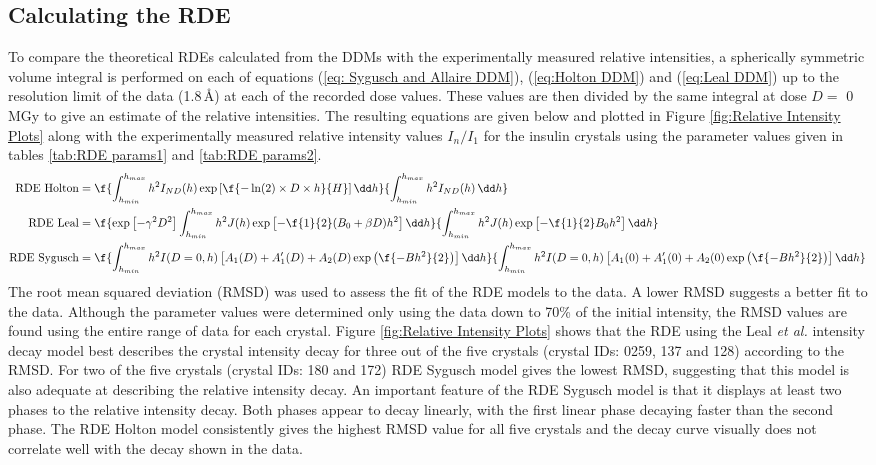 \subsection{Calculating the RDE}
\label{sub:Calculating the RDE}
To compare the theoretical RDEs calculated from the DDMs with the experimentally measured relative intensities, a spherically symmetric volume integral is performed on each of equations (\ref{eq: Sygusch and Allaire DDM}), (\ref{eq:Holton DDM}) and (\ref{eq:Leal DDM}) up to the resolution limit of the data (1.8$\,$\AA) at each of the recorded dose values.
These values are then divided by the same integral at dose $D =$ 0$\,$MGy to give an estimate of the relative intensities.
The resulting equations are given below and plotted in Figure \ref{fig:Relative Intensity Plots} along with the experimentally measured relative intensity values $I_n/I_1$ for the insulin crystals using the parameter values given in tables \ref{tab:RDE params1} and \ref{tab:RDE params2}.
\begin{align}
\text{RDE Holton} &= \f{\int^{h_{max}}_{h_{min}}{h^2 I_{ND}(h) \exp \left[ \f{- \ln(2) \times D \times h}{H}\right]}\, \dd h}{\int^{h_{max}}_{h_{min}}{h^2 I_{ND}(h)}\, \dd h} \label{eqrdeholt}\\
\text{RDE Leal} &= \f{\exp\left[ -\gamma^2 D^2 \right] \int^{h_{max}}_{h_{min}}{h^2 J(h) \exp\left[ -\f{1}{2}(B_0 + \beta D)h^2\right]}\, \dd h }{\int^{h_{max}}_{h_{min}}{h^2 J(h) \exp\left[ -\f{1}{2} B_0 h^2\right]}\, \dd h }  \label{eqrdeleal}\\
\text{RDE Sygusch} &= \f{\int^{h_{max}}_{h_{min}}{h^2 I(D=0,h) \left[ A_1(D) + A'_1(D) + A_2(D) \exp\left( \f{-B h^2}{2}\right)\right]}\, \dd h}{\int^{h_{max}}_{h_{min}}{h^2 I(D=0,h) \left[ A_1(0) + A'_1(0) + A_2(0) \exp\left( \f{-B h^2}{2}\right)\right]}\, \dd h} \label{eqrdesyg}
\end{align}
The root mean squared deviation (RMSD) was used to assess the fit of the RDE models to the data.
A lower RMSD suggests a better fit to the data.
Although the parameter values were determined only using the data down to 70\% of the initial intensity, the RMSD values are found using the entire range of data for each crystal.
Figure \ref{fig:Relative Intensity Plots} shows that the RDE using the Leal \textit{et al.} intensity decay model best describes the crystal intensity decay for three out of the five crystals (crystal IDs: 0259, 137 and 128) according to the RMSD.
For two of the five crystals (crystal IDs: 180 and 172) RDE Sygusch model gives the lowest RMSD, suggesting that this model is also adequate at describing the relative intensity decay.
An important feature of the RDE Sygusch model is that it displays at least two phases to the relative intensity decay.
Both phases appear to decay linearly, with the first linear phase decaying faster than the second phase.
The RDE Holton model consistently gives the highest RMSD value for all five crystals and the decay curve visually does not correlate well with the decay shown in the data.

